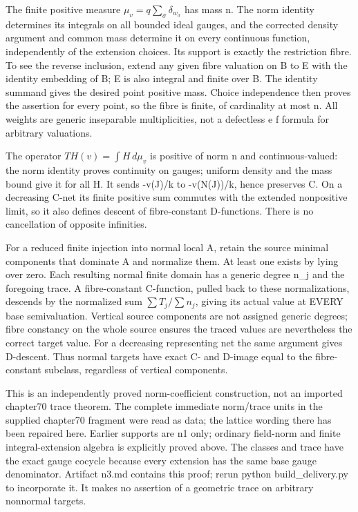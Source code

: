 \documentclass[11pt]{article}
\begin{document}
The finite positive measure \(\mu_v=q\sum_\sigma\delta_{w_\sigma}\) has mass n. The norm identity determines its integrals on all bounded ideal gauges, and the corrected density argument and common mass determine it on every continuous function, independently of the extension choices. Its support is exactly the restriction fibre. To see the reverse inclusion, extend any given fibre valuation on B to E with the identity embedding of B; E is also integral and finite over B. The identity summand gives the desired point positive mass. Choice independence then proves the assertion for every point, so the fibre is finite, of cardinality at most n. All weights are generic inseparable multiplicities, not a defectless e f formula for arbitrary valuations.

The operator \(T H(v)=\int H\,d\mu_v\) is positive of norm n and continuous-valued: the norm identity proves continuity on gauges; uniform density and the mass bound give it for all H. It sends -v(J)/k to -v(N(J))/k, hence preserves C. On a decreasing C-net its finite positive sum commutes with the extended nonpositive limit, so it also defines descent of fibre-constant D-functions. There is no cancellation of opposite infinities.

For a reduced finite injection into normal local A, retain the source minimal components that dominate A and normalize them. At least one exists by lying over zero. Each resulting normal finite domain has a generic degree n\_j and the foregoing trace. A fibre-constant C-function, pulled back to these normalizations, descends by the normalized sum \(\sum T_j/\sum n_j\), giving its actual value at EVERY base semivaluation. Vertical source components are not assigned generic degrees; fibre constancy on the whole source ensures the traced values are nevertheless the correct target value. For a decreasing representing net the same argument gives D-descent. Thus normal targets have exact C- and D-image equal to the fibre-constant subclass, regardless of vertical components.

This is an independently proved norm-coefficient construction, not an imported chapter70 trace theorem. The complete immediate norm/trace units in the supplied chapter70 fragment were read as data; the lattice wording there has been repaired here. Earlier supports are n1 only; ordinary field-norm and finite integral-extension algebra is explicitly proved above. The classes and trace have the exact gauge cocycle because every extension has the same base gauge denominator. Artifact n3.md contains this proof; rerun python build\_delivery.py to incorporate it. It makes no assertion of a geometric trace on arbitrary nonnormal targets.
\end{document}
